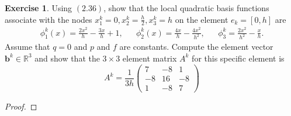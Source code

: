 \documentclass{amsart}
\theoremstyle{plain}
\theoremstyle{definition}
\newtheorem{exer}{Exercise}[section]
\newcommand{\R}{\mathbb{R}}
\begin{document}
\begin{exer}
    Using $(2.36)$, show that the local quadratic basis functions associate with the nodes $x_1^k = 0, x_2^k = \frac{h}{2}, x_3^k = h$ on the element $e_k = [0,h]$ are 
    \begin{align*}
        \phi_1^k(x) = \frac{2x^2}{h}-\frac{3x}{h}+ 1, && \phi_2^k(x) = \frac{4x}{h}-\frac{4x^2}{h^2}, && \phi_3^k = \frac{2x^2}{h^2}-\frac{x}{h}.
    \end{align*}
    Assume that $q=0$ and $p$ and $f$ are constants. Compute the element vector $\mathbf{b}^k \in \R^3$ and show that the $3\times3$ element matrix $A^k$ for this specific element is 
    $$A^k = \frac{1}{3h}\begin{pmatrix}
        7 & -8 & 1 \\ -8 & 16 & -8\\ 1 & -8 & 7 
    \end{pmatrix}$$
\end{exer}
\begin{proof}
    
\end{proof}

\printbibliography
\end{document}
